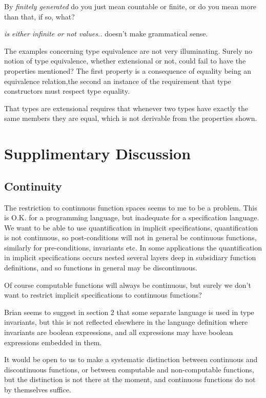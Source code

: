 By {\em finitely generated} do you just mean countable or finite, or
do you mean more than that, if so, what?

{\em is either {\em infinite} or not values..} doesn't make grammatical sense.

The examples concerning type equivalence are not very illuminating.
Surely no notion of type equivalence, whether extensional or not, could
fail to have the properties mentioned?
The first property is a consequence of equality being an equivalence relation,the second an instance of the requirement that type constructors must
respect type equality.

That types are extensional requires that whenever two types have exactly
the same members they are equal, which is not derivable from the properties
shown.

\section{Supplimentary Discussion}

\subsection{Continuity}

The restriction to continuous function spaces seems to me to be a problem.
This is O.K. for a programming language, but inadequate for a specification
language.
We want to be able to use quantification in implicit specifications,
quantification is not continuous, so post-conditions will not in general
be continuous functions, similarly for pre-conditions, invariants etc.
In some applications the quantification in implicit specifications occurs
nested several layers deep in subsidiary function definitions, and so
functions in general may be discontinuous.

Of course computable functions will always be continuous, but surely we
don't want to restrict implicit specifications to continuous functions?

Brian seems to suggest in section 2 that some separate language is used
in type invariants, but this is not reflected elsewhere in the language
definition where invariants are boolean expressions, and all expressions
may have boolean expressions embedded in them.

It would be open to us to make a systematic distinction between continuous
and discontinuous functions, or between computable and non-computable
functions, but the distinction is not there at the moment, and continuous
functions do not by themselves suffice.

